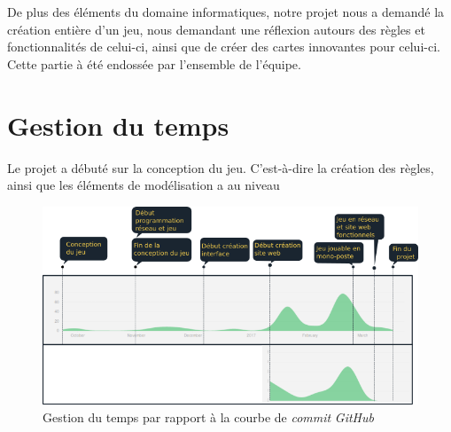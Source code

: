 \documentclass[a4paper,11pt]{report}
\begin{document}
    De plus des éléments du domaine informatiques, notre projet nous a demandé la création entière d'un jeu, nous demandant une réflexion autours des règles et fonctionnalités de celui-ci, ainsi que de créer des cartes innovantes pour celui-ci. Cette partie à été endossée par l'ensemble de l'équipe.
    
  \section{Gestion du temps}
    Le projet a débuté sur la conception du jeu. C'est-à-dire la création des règles, ainsi que les éléments de modélisation a au niveau
    \begin{figure}[th]
      \begin{center}
        \includegraphics[scale=0.5]{Assets/gestionTemps.png}
        \caption{Gestion du temps par rapport à la courbe de \textit{commit} \textit{GitHub}}
        \label{RepTime}
      \end{center}
    \end{figure}
\end{document}
